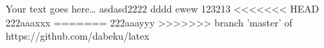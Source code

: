 
Your text goes here…
asdasd2222
dddd ewew
123213
<<<<<<< HEAD
222aaaxxx
=======
222aaayyy
>>>>>>> branch 'master' of https://github.com/dabeku/latex
